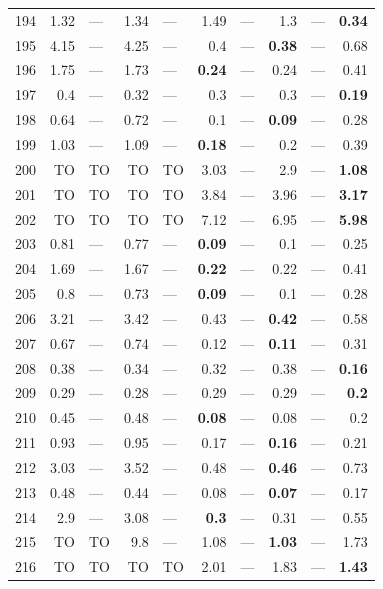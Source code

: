 \begin{longtable}{lr@{\hskip 4pt}l@{\hskip 12pt}r@{\hskip 4pt}l@{\hskip 12pt}r@{\hskip 4pt}l@{\hskip 12pt}r@{\hskip 4pt}l@{\hskip 12pt}r}
194 & 1.32 & --- & 1.34 & --- & 1.49 & --- & 1.3 & --- & \textbf{0.34} \\
195 & 4.15 & --- & 4.25 & --- & 0.4 & --- & \textbf{0.38} & --- & 0.68 \\
196 & 1.75 & --- & 1.73 & --- & \textbf{0.24} & --- & 0.24 & --- & 0.41 \\
197 & 0.4 & --- & 0.32 & --- & 0.3 & --- & 0.3 & --- & \textbf{0.19} \\
198 & 0.64 & --- & 0.72 & --- & 0.1 & --- & \textbf{0.09} & --- & 0.28 \\
199 & 1.03 & --- & 1.09 & --- & \textbf{0.18} & --- & 0.2 & --- & 0.39 \\
200 & TO & TO & TO & TO & 3.03 & --- & 2.9 & --- & \textbf{1.08} \\
201 & TO & TO & TO & TO & 3.84 & --- & 3.96 & --- & \textbf{3.17} \\
202 & TO & TO & TO & TO & 7.12 & --- & 6.95 & --- & \textbf{5.98} \\
203 & 0.81 & --- & 0.77 & --- & \textbf{0.09} & --- & 0.1 & --- & 0.25 \\
204 & 1.69 & --- & 1.67 & --- & \textbf{0.22} & --- & 0.22 & --- & 0.41 \\
205 & 0.8 & --- & 0.73 & --- & \textbf{0.09} & --- & 0.1 & --- & 0.28 \\
206 & 3.21 & --- & 3.42 & --- & 0.43 & --- & \textbf{0.42} & --- & 0.58 \\
207 & 0.67 & --- & 0.74 & --- & 0.12 & --- & \textbf{0.11} & --- & 0.31 \\
208 & 0.38 & --- & 0.34 & --- & 0.32 & --- & 0.38 & --- & \textbf{0.16} \\
209 & 0.29 & --- & 0.28 & --- & 0.29 & --- & 0.29 & --- & \textbf{0.2} \\
210 & 0.45 & --- & 0.48 & --- & \textbf{0.08} & --- & 0.08 & --- & 0.2 \\
211 & 0.93 & --- & 0.95 & --- & 0.17 & --- & \textbf{0.16} & --- & 0.21 \\
212 & 3.03 & --- & 3.52 & --- & 0.48 & --- & \textbf{0.46} & --- & 0.73 \\
213 & 0.48 & --- & 0.44 & --- & 0.08 & --- & \textbf{0.07} & --- & 0.17 \\
214 & 2.9 & --- & 3.08 & --- & \textbf{0.3} & --- & 0.31 & --- & 0.55 \\
215 & TO & TO & 9.8 & --- & 1.08 & --- & \textbf{1.03} & --- & 1.73 \\
216 & TO & TO & TO & TO & 2.01 & --- & 1.83 & --- & \textbf{1.43} \\

\end{longtable}
